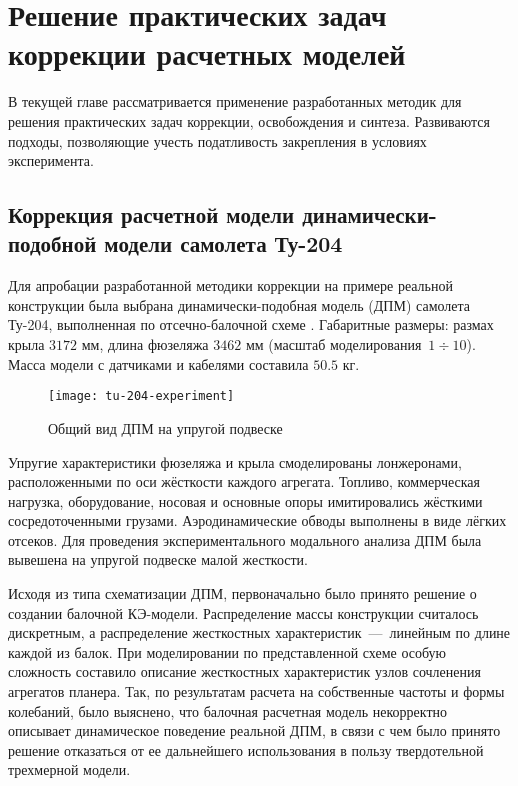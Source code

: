 \chapter{Решение практических задач коррекции расчетных моделей} 

В текущей главе рассматривается применение разработанных методик для решения практических задач коррекции, освобождения и синтеза. Развиваются подходы, позволяющие учесть податливость закрепления в условиях эксперимента. 

\section{Коррекция расчетной модели динамически-подобной модели самолета \mbox{Ту-204}}

Для апробации разработанной методики коррекции на примере реальной конструкции была выбрана динамически-подобная модель (ДПМ) самолета \mbox{Ту-204}, выполненная по отсечно-балочной схеме . Габаритные размеры: размах крыла $ 3172 $ мм, длина фюзеляжа $ 3462 $ мм (масштаб моделирования~$ 1 \div 10 $). Масса модели с датчиками и кабелями составила $ 50.5 $ кг.

\begin{figure}[!htb]
	\centerfloat
	\texttt{[image: tu-204-experiment]}
	\caption{Общий вид ДПМ на упругой подвеске} \label{fig:tu-204-experiment}	
\end{figure}

Упругие характеристики фюзеляжа и крыла смоделированы лонжеронами, расположенными по оси жёсткости каждого агрегата. Топливо, коммерческая нагрузка, оборудование, носовая и основные опоры имитировались жёсткими сосредоточенными грузами. Аэродинамические обводы выполнены в виде лёгких отсеков. Для проведения экспериментального модального анализа ДПМ была вывешена на упругой подвеске малой жесткости.

Исходя из типа схематизации ДПМ, первоначально было принято решение о создании балочной КЭ-модели. Распределение массы конструкции считалось дискретным, а распределение жесткостных характеристик~---~линейным по длине каждой из балок. При моделировании по представленной схеме особую сложность составило описание жесткостных характеристик узлов сочленения агрегатов планера. Так, по результатам расчета на собственные частоты и формы колебаний, было выяснено, что балочная расчетная модель некорректно описывает динамическое поведение реальной ДПМ, в связи с чем было принято решение отказаться от ее дальнейшего использования в пользу твердотельной трехмерной модели.

